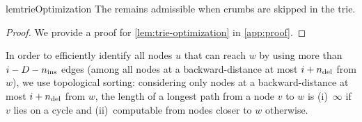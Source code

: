 \begin{restatable}{lem}{trieOptimization}
	\label{lem:trie-optimization}
	The \seedh remains admissible when crumbs are skipped in the trie.
\end{restatable}
\begin{proof}
	We provide a proof for \cref{lem:trie-optimization} in \cref{app:proof}.
	\qedwhite
\end{proof}


In order to efficiently identify all nodes $u$ that can reach $w$ by using more
than $i-D-n_\text{ins}$ edges (among all nodes at a backward-distance at most
$i+n_\text{del}$ from $w$), we use topological sorting: considering only nodes at a
backward-distance at most $i+n_\text{del}$ from $w$, the length of a longest path
from a node $v$ to $w$ is (i)~$\infty$ if $v$ lies on a cycle and
(ii)~computable from nodes closer to $w$ otherwise.
